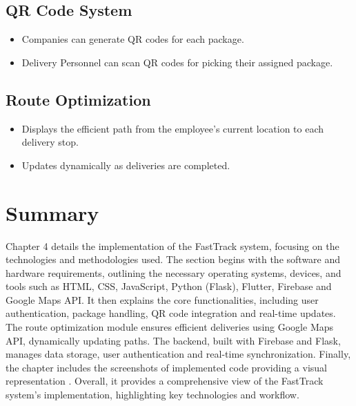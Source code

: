 \subsection{QR Code System}
\begin{itemize}
    \item Companies can generate QR codes for each package.
    \item Delivery Personnel can  scan QR codes for picking their assigned package.
\end{itemize}
\subsection{Route Optimization}
\begin{itemize}
    \item Displays the efficient path from the employee’s current location to each delivery stop.
    \item Updates dynamically as deliveries are completed.
\end{itemize}
\section{Summary}
Chapter 4 details the implementation of the FastTrack system, focusing on the technologies and
methodologies used. The section begins with the software and hardware requirements, outlining the
necessary operating systems, devices, and tools such as HTML, CSS, JavaScript, Python (Flask),
Flutter, Firebase and Google Maps API.
It then explains the core functionalities, including user authentication, package handling, QR code
integration and real-time updates. The route optimization module ensures efficient deliveries using
Google Maps API, dynamically updating paths. The backend, built with Firebase and Flask,
manages data storage, user authentication and real-time synchronization.
Finally, the chapter includes the screenshots of implemented code providing a visual representation
. Overall, it provides a comprehensive view of the FastTrack system’s implementation, highlighting
key technologies and workflow.